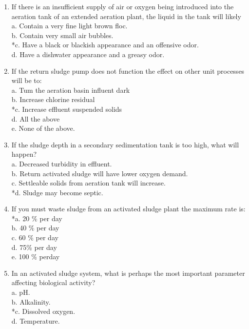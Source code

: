 \begin{enumerate}
\item If there is an insufficient supply of air or oxygen being introduced into the aeration tank of an extended aeration plant, the liquid in the tank will likely \\
a. Contain a very fine light brown floc. \\
b. Contain very small air bubbles. \\
*c. Have a black or blackish appearance and an offensive odor. \\
d. Have a dishwater appearance and a greasy odor. \\

\item If the return sludge pump does not function the effect on other unit processes will be to: \\
a. Tum the aeration basin influent dark \\
b. Increase chlorine residual \\
*c. Increase effluent suspended solids \\
d. All the above \\
e. None of the above. \\

\item If the sludge depth in a secondary sedimentation tank is too high, what will happen? \\
a. Decreased turbidity in effluent. \\
b. Return activated sludge will have lower oxygen demand. \\
c. Settleable solids from aeration tank will increase. \\
*d. Sludge may become septic. \\

\item If you must waste sludge from an activated sludge plant the maximum rate is: \\
*a. 20 \% per day \\
b. 40 \% per day \\
c. 60 \% per day \\
d. 75\% per day \\
e. 100 \% perday \\

\item In an activated sludge system, what is perhaps the most important parameter affecting biological activity? \\
a. pH. \\
b. Alkalinity. \\
*c. Dissolved oxygen. \\
d. Temperature. \\


\end{enumerate}

